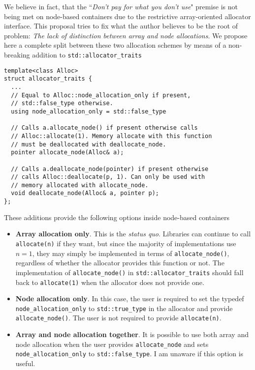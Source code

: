 \documentclass[11pt]{article}
\begin{document}
We believe in fact, that the ``{\it Don't pay for what you don't use}" premise
is not being met on node-based containers due to the restrictive
array-oriented allocator interface. This proposal tries to fix what the author
believes to be the root of problem: {\it The lack of distinction between array
and node allocations}.  We propose here a complete split between these two
allocation schemes by means of a non-breaking addition to
\texttt{std::allocator\_traits}
\medskip
\begin{lstlisting}
template<class Alloc>
struct allocator_traits {
  ...
  // Equal to Alloc::node_allocation_only if present,
  // std::false_type otherwise.
  using node_allocation_only = std::false_type

  // Calls a.allocate_node() if present otherwise calls
  // Alloc::allocate(1). Memory allocate with this function
  // must be deallocated with deallocate_node.
  pointer allocate_node(Alloc& a);

  // Calls a.deallocate_node(pointer) if present otherwise
  // calls Alloc::deallocate(p, 1). Can only be used with
  // memory allocated with allocate_node.
  void deallocate_node(Alloc& a, pointer p);
};
\end{lstlisting}
These additions provide the following options inside node-based
containers
\begin{itemize}
\item {\bf Array allocation only}.
This is the {\it status quo}. Libraries can continue to call
\texttt{allocate(n)} if they want, but since the majority of implementations
use $n = 1$, they may simply be implemented in terms of
\texttt{allocate\_node()}, regardless of whether the allocator provides this
function or not. The implementation of \texttt{allocate\_node()} in
\texttt{std::allocator\_traits} should fall back to \texttt{allocate(1)} 
when the allocator does not provide one.

\item {\bf Node allocation only}.
In this case, the user is required to set the typedef \texttt{node\_allocation\_only}
to \texttt{std::true\_type} in the allocator and provide \texttt{allocate\_node()}. The user is
not required to provide \texttt{allocate(n)}.
\item {\bf Array and node allocation together}. It is possible to use
both array {and} node allocation when the user provides \texttt{allocate\_node}
and sets \texttt{node\_allocation\_only} to \texttt{std::false\_type}.
I am unaware if this option is useful.
\end{itemize}
\end{document}
